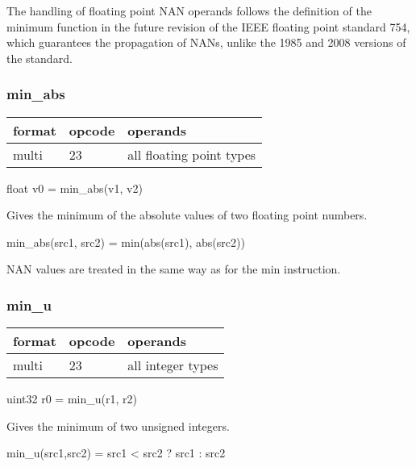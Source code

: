 \documentclass[forwardcom.tex]{subfiles}
\begin{document}
The handling of floating point NAN operands follows the definition of the minimum function in the future revision of the IEEE floating point standard 754, which guarantees the propagation of NANs, unlike the 1985 and 2008 versions of the standard.
\vspace{2mm}

\subsubsection{min\_abs}
\label{table:minAbsInstruction}
\begin{tabular}{|p{12mm}|p{12mm}|p{110mm}|}
\hline
\bfseries format & \bfseries opcode & \bfseries operands \\ \hline
multi & 23 & all floating point types \\ \hline
\end{tabular}
\vspace{2mm}

float v0 = min\_abs(v1, v2)
\vspace{2mm}

Gives the minimum of the absolute values of two floating point numbers.
\vspace{2mm}

min\_abs(src1, src2) = min(abs(src1), abs(src2))
\vspace{2mm}

NAN values are treated in the same way as for the min instruction.

\subsubsection{min\_u}
\label{table:minUInstruction}
\begin{tabular}{|p{12mm}|p{12mm}|p{110mm}|}
\hline
\bfseries format & \bfseries opcode & \bfseries operands \\ \hline
multi & 23 & all integer types \\ \hline
\end{tabular}
\vspace{2mm}

uint32 r0 = min\_u(r1, r2)
\vspace{2mm}

Gives the minimum of two unsigned integers.
\vspace{2mm}

min\_u(src1,src2) = src1 \textless{} src2 ? src1 : src2
\end{document}

